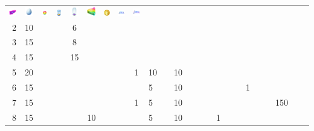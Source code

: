 \begin{table}[t]
\begin{center}
\begin{tabular}{r|g c g c g c g c g c g c g c g c g c g c g c g}
  \includegraphics[width=1em]{images/lure.png} &
  \includegraphics[width=1em]{images/luckyegg.png} &
  \includegraphics[width=1em]{images/rarecandy.png} &
  \includegraphics[width=1em]{images/incubatorlimited.png} &
  \includegraphics[width=1em]{images/incubatorsuper.png} &
  \includegraphics[width=1em]{images/rarecandyxl.png} &
  \includegraphics[width=1em]{images/pokecoin.png} &
  \includegraphics[width=1em]{images/elitefasttm.png} &
  \includegraphics[width=1em]{images/elitechargedtm.png}
    \\
    2 & 10 &    &    &  6 &    &    &    &   &    &    &    &    &    &    &   &   &    &   &   &   &   &   &   \\
    3 & 15 &    &    &  8 &    &    &    &   &    &    &    &    &    &    &   &   &    &   &   &   &   &   &   \\
    4 & 15 &    &    & 15 &    &    &    &   &    &    &    &    &    &    &   &   &    &   &   &   &   &   &   \\
    5 & 20 &    &    &    &    &    &    & 1 & 10 &    & 10 &    &    &    &   &   &    &   &   &   &   &   &   \\
    6 & 15 &    &    &    &    &    &    &   &  5 &    & 10 &    &    &    &   &   &    & 1 &   &   &   &   &   \\
    7 & 15 &    &    &    &    &    &    & 1 &  5 &    & 10 &    &    &    &   &   &    &   &   &   &150&   &   \\
    8 & 15 &    &    &    & 10 &    &    &   &  5 &    & 10 &    &    &    & 1 &   &    &   &   &   &   &   &   \\

\end{tabular}
\end{center}
\end{table}
